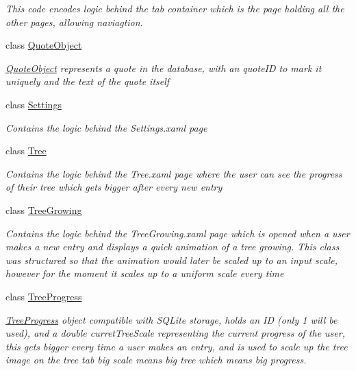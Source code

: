 \begin{DoxyCompactItemize}
\begin{DoxyCompactList}\small\item\em This code encodes logic behind the tab container which is the page holding all the other pages, allowing naviagtion. \end{DoxyCompactList}\item 
class \hyperlink{class_intention_journal_1_1_quote_object}{Quote\+Object}
\begin{DoxyCompactList}\small\item\em \hyperlink{class_intention_journal_1_1_quote_object}{Quote\+Object} represents a quote in the database, with an quote\+ID to mark it uniquely and the text of the quote itself \end{DoxyCompactList}\item 
class \hyperlink{class_intention_journal_1_1_settings}{Settings}
\begin{DoxyCompactList}\small\item\em Contains the logic behind the Settings.\+xaml page \end{DoxyCompactList}\item 
class \hyperlink{class_intention_journal_1_1_tree}{Tree}
\begin{DoxyCompactList}\small\item\em Contains the logic behind the Tree.\+xaml page where the user can see the progress of their tree which gets bigger after every new entry \end{DoxyCompactList}\item 
class \hyperlink{class_intention_journal_1_1_tree_growing}{Tree\+Growing}
\begin{DoxyCompactList}\small\item\em Contains the logic behind the Tree\+Growing.\+xaml page which is opened when a user makes a new entry and displays a quick animation of a tree growing. This class was structured so that the animation would later be scaled up to an input scale, however for the moment it scales up to a uniform scale every time \end{DoxyCompactList}\item 
class \hyperlink{class_intention_journal_1_1_tree_progress}{Tree\+Progress}
\begin{DoxyCompactList}\small\item\em \hyperlink{class_intention_journal_1_1_tree_progress}{Tree\+Progress} object compatible with S\+Q\+Lite storage, holds an ID (only 1 will be used), and a double curret\+Tree\+Scale representing the current progress of the user, this gets bigger every time a user makes an entry, and is used to scale up the tree image on the tree tab big scale means big tree which means big progress. \end{DoxyCompactList}\item 

\end{DoxyCompactItemize}
